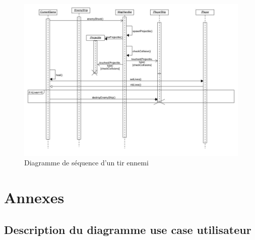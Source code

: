 \documentclass[a4paper,12pt]{article}
\begin{document}
\begin{figure}[hbtp]
\centering
\includegraphics[scale=0.3]{images/enemy_shooting.jpg}
\caption{Diagramme de séquence d'un tir ennemi }
\end{figure}

\newpage
\section{Annexes}
\subsection{ Description du diagramme use case utilisateur}
\end{document}
